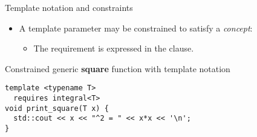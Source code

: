 \begin{frame}[t,fragile]{Template notation and constraints}

\begin{itemize}
  \item A template parameter may be constrained to satisfy a \emph{concept}:
    \begin{itemize}
      \item The requirement is expressed in the  clause.
    \end{itemize}
\end{itemize}

\begin{block}{Constrained generic \textbf{square} function with template notation}
\begin{lstlisting}
template <typename T>
  requires integral<T>
void print_square(T x) {
  std::cout << x << "^2 = " << x*x << '\n';
}
\end{lstlisting}
\end{block}

\end{frame}
